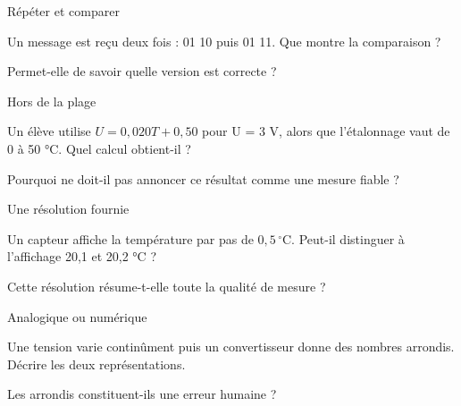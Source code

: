 \par\noindent\begin{minipage}{\linewidth}
\begin{exercice}[3]{Répéter et comparer}
\begin{questions}
\item Un message est reçu deux fois : 01 10 puis 01 11. Que montre la comparaison ?
\item Permet-elle de savoir quelle version est correcte ?
\end{questions}
\end{exercice}
\end{minipage}
\par\noindent\begin{minipage}{\linewidth}
\begin{exercice}[3]{Hors de la plage}
\begin{questions}
\item Un élève utilise $U=0{,}020T+0{,}50$ pour U = 3 V, alors que l’étalonnage vaut de 0 à 50 °C. Quel calcul obtient-il ?
\item Pourquoi ne doit-il pas annoncer ce résultat comme une mesure fiable ?
\end{questions}
\end{exercice}
\end{minipage}
\par\noindent\begin{minipage}{\linewidth}
\begin{exercice}[3]{Une résolution fournie}
\begin{questions}
\item Un capteur affiche la température par pas de $0{,}5\,^{\circ}\mathrm C$. Peut-il distinguer à l’affichage 20,1 et 20,2 °C ?
\item Cette résolution résume-t-elle toute la qualité de mesure ?
\end{questions}
\end{exercice}
\end{minipage}
\par\noindent\begin{minipage}{\linewidth}
\begin{exercice}[3]{Analogique ou numérique}
\begin{questions}
\item Une tension varie continûment puis un convertisseur donne des nombres arrondis. Décrire les deux représentations.
\item Les arrondis constituent-ils une erreur humaine ?
\end{questions}
\end{exercice}
\end{minipage}
